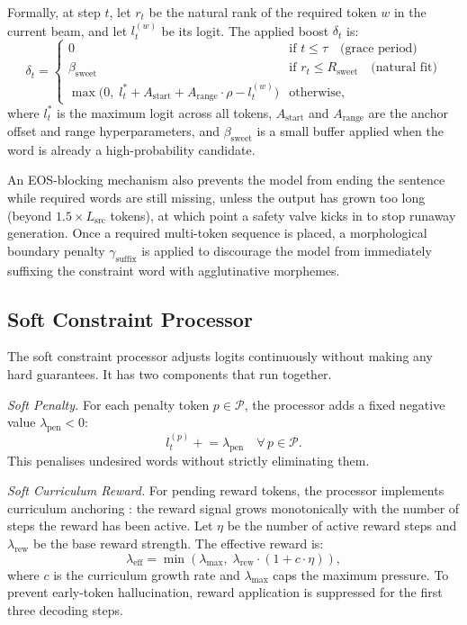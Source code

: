 \documentclass{tlp}
\begin{document}
Formally, at step $t$, let $r_t$ be the natural rank of the required token $w$ in
the current beam, and let $l_t^{(w)}$ be its logit. The applied boost $\delta_t$ is:
\begin{equation}
\delta_t = \begin{cases}
    0 & \text{if } t \leq \tau \quad \text{(grace period)} \\[3pt]
    \beta_{\text{sweet}} & \text{if } r_t \leq R_{\text{sweet}} \quad
      \text{(natural fit)} \\[3pt]
    \max\!\bigl(0,\; l_t^{*} + A_{\text{start}} + A_{\text{range}} \cdot \rho -
      l_t^{(w)}\bigr) & \text{otherwise,}
\end{cases}
\label{eq:anchor}
\end{equation}
where $l_t^{*}$ is the maximum logit across all tokens, $A_{\text{start}}$ and
$A_{\text{range}}$ are the anchor offset and range hyperparameters, and
$\beta_{\text{sweet}}$ is a small buffer applied when the word is already a
high-probability candidate.

An EOS-blocking mechanism also prevents the model from ending the sentence while
required words are still missing, unless the output has grown too long (beyond
$1.5 \times L_{\text{src}}$ tokens), at which point a safety valve kicks in to stop
runaway generation. Once a required multi-token sequence is placed, a morphological
boundary penalty $\gamma_{\text{suffix}}$ is applied to discourage the model from
immediately suffixing the constraint word with agglutinative morphemes.

\subsection{Soft Constraint Processor}

The soft constraint processor adjusts logits continuously without making any hard
guarantees. It has two components that run together.

\textit{Soft Penalty.} For each penalty token $p \in \mathcal{P}$, the processor
adds a fixed negative value $\lambda_{\text{pen}} < 0$:
\begin{equation}
    l_t^{(p)} \mathrel{+}= \lambda_{\text{pen}} \quad \forall\, p \in \mathcal{P}.
\end{equation}
This penalises undesired words without strictly eliminating them.

\textit{Soft Curriculum Reward.} For pending reward tokens, the processor implements
curriculum anchoring \citep{bengio2009curriculum}: the reward signal grows
monotonically with the number of steps the reward has been active. Let $\eta$ be the
number of active reward steps and $\lambda_{\text{rew}}$ be the base reward strength.
The effective reward is:
\begin{equation}
    \lambda_{\text{eff}} = \min\!\left(\lambda_{\text{max}},\;
    \lambda_{\text{rew}} \cdot (1 + c \cdot \eta)\right),
\end{equation}
where $c$ is the curriculum growth rate and $\lambda_{\text{max}}$ caps the maximum
pressure. To prevent early-token hallucination, reward application is suppressed for
the first three decoding steps.
\end{document}
